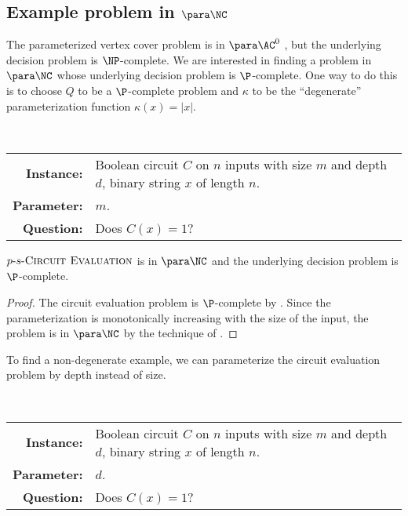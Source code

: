 \subsection{Example problem in \texorpdfstring{$\para \NC$}{paraNC}}

The parameterized vertex cover problem is in $\para \AC^0$ \autocite{bst15}, but the underlying decision problem is $\NP$-complete.
We are interested in finding a problem in $\para \NC$ whose underlying decision problem is $\P$-complete.
One way to do this is to choose $Q$ to be a $\P$-complete problem and $\kappa$ to be the ``degenerate'' parameterization function $\kappa(x) = |x|$.

\begin{definition}
  \mbox{} \\
  \begin{tabular}{r p{9.2cm}}
    \textbf{Instance:} & Boolean circuit $C$ on $n$ inputs with size $m$ and depth $d$, binary string $x$ of length $n$. \\
    \textbf{Parameter:} & $m$. \\
    \textbf{Question:} & Does $C(x) = 1$?
  \end{tabular}
\end{definition}

\begin{theorem}
  $p \textnormal{-} s \textnormal{-} \textsc{Circuit Evaluation}$ is in $\para \NC$ and the underlying decision problem is $\P$-complete.
\end{theorem}
\begin{proof}
  The circuit evaluation problem is $\P$-complete by \autocite{ladner75}.
  Since the parameterization is monotonically increasing with the size of the input, the problem is in $\para \NC$ by the technique of \autocite[Proposition~1.7]{fg06}.
\end{proof}

To find a non-degenerate example, we can parameterize the circuit evaluation problem by depth instead of size.

\begin{definition}
  \mbox{} \\
  \begin{tabular}{r p{9.2cm}}
    \textbf{Instance:} & Boolean circuit $C$ on $n$ inputs with size $m$ and depth $d$, binary string $x$ of length $n$. \\
    \textbf{Parameter:} & $d$. \\
    \textbf{Question:} & Does $C(x) = 1$?
  \end{tabular}
\end{definition}

